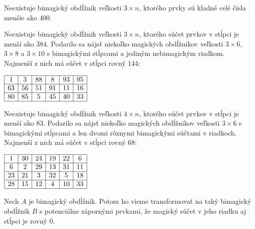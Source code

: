 \begin{result} Neexistuje bimagický obdĺžnik veľkosti $3 \times n$, ktorého prvky sú kladné celé čísla menšie ako $400$.
\end{result} 

\begin{result} Neexistuje bimagický obdĺžnik veľkosti $3 \times n$, ktorého súčet prvkov v stĺpci je menší ako $384$. Podarilo sa nájsť niekoľko magických obdĺžnikov veľkosti $3 \times 6$, $3 \times 8$ a $3 \times 10$ s bimagickými stĺpcami a jediným nebimagickým riadkom. Najmenší z nich má súčet v stĺpci rovný $144$:
\end{result}

\begin{center}
$\begin{array}{ |c|c|c|c|c|c| } 
\hline
1 & 3 & 88 & 8 & 93 & 95 \\ 
\hline
63 & 56 & 51 & 91 & 11 & 16 \\ 
\hline
80 & 85 & 5 & 45 & 40 & 33 \\ 
\hline
\end{array}$
\end{center}

\begin{result} Neexistuje bimagický obdĺžnik veľkosti $4 \times n$, ktorého súčet prvkov v stĺpci je menší ako $83$. Podarilo sa nájsť niekoľko magických obdĺžnikov veľkosti $3 \times 6$ s bimagickými stĺpcami a len dvomi rôznymi bimagickými súčtami v riadkoch. Najmenší z nich má súčet v stĺpci rovný $68$:
\end{result}

\begin{center}
$\begin{array}{ |c|c|c|c|c|c| } 
\hline
1 & 30 & 24 & 19 & 22 & 6 \\ 
\hline
6 & 2 & 29 & 13 & 31 & 11 \\ 
\hline
23 & 21 & 3 & 32 & 5 & 18 \\ 
\hline
28 & 15 & 12 & 4 & 10 & 33 \\ 
\hline
\end{array}$
\end{center}

\begin{theorem} 
\label{rectangle0}
Nech $A$ je bimagický obdĺžnik. Potom ho vieme transformovať na taký bimagický obdĺžnik $B$ s potenciálne zápornými prvkami, že magický súčet v jeho riadku aj stĺpci je rovný $0$.
\end{theorem}

